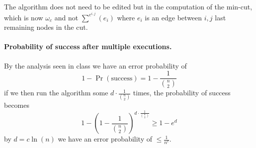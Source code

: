 The algorithm does not need to be edited but in the computation of the min-cut, which is now $\omega_c$ and not $\sum^{e^{i, j}} \left( e_i \right)$ where $e_i$ is an edge between $i, j$ last remaining nodes in the cut.

\paragraph{Probability of success after multiple executions.}
By the analysis seen in class we have an error probability of
\begin{equation*}
1 - \Pr({\text{success}}) = 1 - \frac{1}{{{n} \choose {2}}}
\end{equation*}
if we then run the algorithm some $d \cdot \frac{1}{{{n} \choose {2}}}$ times, the probability of success becomes
\begin{equation*}
1 - \left(1 - \frac{1}{{{n} \choose {2}}} \right)^{d \cdot \frac{1}{{{n} \choose {2}}}} \geq 1 - e^{d}
\end{equation*}
by $d = c \ln(n)$ we have an error probability of $\leq \frac{1}{n^c}$.